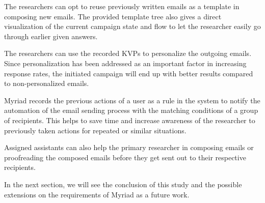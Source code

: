 The researchers can opt to reuse previously written emails as a template in composing new emails. The provided template tree also gives a direct visualization of the current campaign state and flow to let the researcher easily go through earlier given answers.
\vspace{1cm}

The researchers can use the recorded \ac{KVP}s to personalize the outgoing emails. Since personalization has been addressed as an important factor in increasing response rates, the initiated campaign will end up with better results compared to non-personalized emails.
\vspace{1cm}

Myriad records the previous actions of a user as a rule in the system to notify the automation of the email sending process with the matching conditions of a group of recipients. This helps to save time and increase awareness of the researcher to previously taken actions for repeated or similar situations.
\vspace{1cm}

Assigned assistants can also help the primary researcher in composing emails or proofreading the composed emails before they get sent out to their respective recipients.

In the next section, we will see the conclusion of this study and the possible extensions on the requirements of Myriad as a future work.

